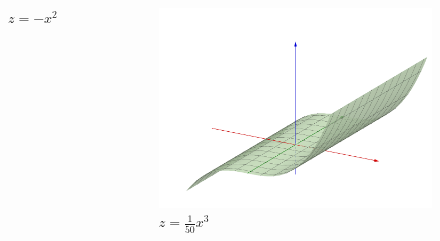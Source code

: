 \documentclass[10pt]{beamer}
\begin{document}
\begin{frame}
\begin{minipage}{\textwidth}
\begin{columns}
\begin{figure}
\caption{$z = -x^2$}
\end{figure}
\column{0.25\paperwidth}
\begin{figure}
\includegraphics[width = 0.25\paperwidth]{fail3.png}
\caption{$z = \frac{1}{50}	x^3$}
\end{figure}
\end{columns}
\end{minipage}
\end{frame}
\end{document}
